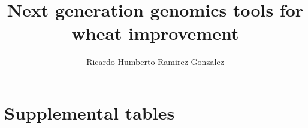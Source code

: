 \documentclass[12pt,a4paper,oneside]{book}
\author{Ricardo Humberto Ramirez Gonzalez}
\title{Next generation genomics tools for wheat improvement}
\begin{document}
\tableofcontents
\listoffigures
\listoftables
\lstlistoflistings
\printglossaries

%







\appendix
\chapter{Supplemental tables}



%



\end{document}
